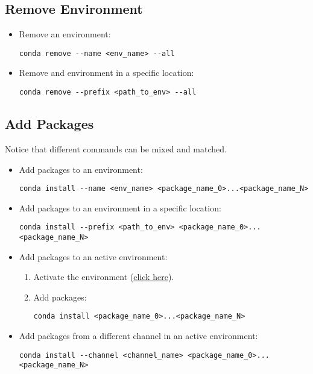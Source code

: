 \subsection{Remove Environment}

\begin{itemize}
    \item Remove an environment:
    \begin{verbatim}
conda remove --name <env_name> --all
    \end{verbatim}
    \item Remove and environment in a specific location:
    \begin{verbatim}
conda remove --prefix <path_to_env> --all
    \end{verbatim}
\end{itemize}


\subsection{Add Packages}

Notice that different commands can be mixed and matched.
\begin{itemize}
    \item Add packages to an environment:
    \begin{verbatim}
conda install --name <env_name> <package_name_0>...<package_name_N>
    \end{verbatim}
    \item Add packages to an environment in a specific location:
    \begin{verbatim}
conda install --prefix <path_to_env> <package_name_0>...<package_name_N>
    \end{verbatim}
    \item Add packages to an active environment:
    \begin{enumerate}
        \item Activate the environment (\hyperref[conda:activateEnv]{click here}).
        \item Add packages: 
        \begin{verbatim}
conda install <package_name_0>...<package_name_N>
        \end{verbatim}
    \end{enumerate}
    \item Add packages from a different channel in an active environment:
    \begin{verbatim}
conda install --channel <channel_name> <package_name_0>...<package_name_N>
    \end{verbatim}
\end{itemize}